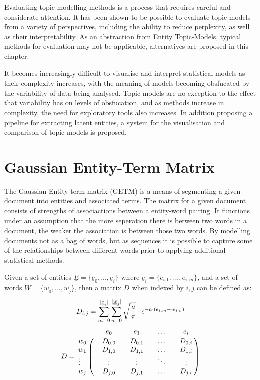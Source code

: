 \documentclass[10pt]{report}
\begin{document}
Evaluating topic modelling methods is a process that requires careful and considerate attention. It has been shown to be possible to evaluate topic models from a variety of perspectives, including the ability to reduce perplexity, as well as their interpretability. As an abstraction from Entity Topic-Models, typical methods for evaluation may not be applicable, alternatives are proposed in this chapter.

It becomes increasingly difficult to visualise and interpret statistical models as their complexity increases, with the meaning of models becoming obsfucated by the variability of data being analysed. Topic models are no exception to the effect that variability has on levels of obsfucation, and as methods increase in complexity, the need for exploratory tools also increases. In addition proposing a pipeline for extracting latent entities, a system for the visualisation and comparison of topic models is proposed.

\section{Gaussian Entity-Term Matrix}

The Gaussian Entity-term matrix (GETM) is a means of segmenting a given document into entities and associated terms. The matrix for a given document consists of strengths of associactions between a entity-word pairing. It functions under an assumption that the more seperation there is between two words in a document, the weaker the association is between those two  words. By modelling documents not as a bag of words, but as sequences it is possible to capture some of the relationships between different words prior to applying additional statistical methods.

Given a set of entities \(\underline{E} = \{\underline{e}_0, ..., \underline{e}_i\}\) where \(\underline{e}_i = \{e_{i,0}, ..., e_{i,m}\}\), and a set of words \(\underline{W}=\{\underline{w}_0, ..., \underline{w}_j\}\), then a matrix \(D\) when indexed by \(i,j\) can be defined as:
\[
  D_{i,j}= \sum^{|\underline{e}_i|}_{m=0}\sum^{|\underline{w}_j|}_{n=0}\sqrt{a\over{\pi}}\cdot e^{-a\cdot(e_{i,m} - w_{j,n})}
\]
\[
  D =
  \bordermatrix{&&e_0 && e_1 &&\hdots && e_i\cr
    w_0 && D_{0,0} && D_{0,1} && \hdots && D_{0,i}\cr
    w_1 && D_{1,0} && D_{1,1} && \hdots && D_{1,i}\cr
    \vdots && \vdots && \vdots && \ddots && \vdots\cr
    w_j && D_{j,0} && D_{j,1} && \hdots && D_{j,i}
  }
\]
\end{document}
